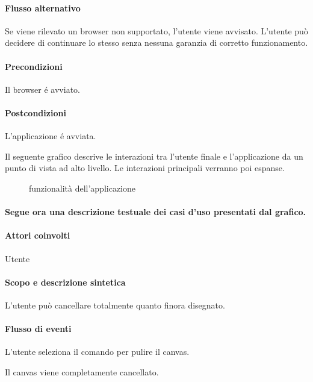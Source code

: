\paragraph{Flusso alternativo}
Se viene rilevato un browser non supportato, l'utente viene avvisato. L'utente pu\`o decidere di continuare lo stesso senza nessuna garanzia di corretto funzionamento.
\paragraph{Precondizioni} Il browser \'e avviato.
\paragraph{Postcondizioni} L'applicazione \'e avviata.

Il seguente grafico descrive le interazioni tra l'utente finale e l'applicazione da un punto di vista ad alto livello. Le interazioni principali verranno poi espanse.
\begin{figure}[!ht]
\centering
\vspace{20pt} 
\caption{funzionalit\`a dell'applicazione}
\end{figure}

\paragraph{Segue ora una descrizione testuale dei casi d'uso presentati dal grafico.}

\paragraph{Attori coinvolti} Utente
\paragraph{Scopo e descrizione sintetica}
L'utente pu\`o cancellare totalmente quanto finora disegnato.
\paragraph{Flusso di eventi}
\begin{elenconumerato}[\textbf{}]{\subsubsecindent}
\item L'utente seleziona il comando per pulire il canvas. 
\item Il canvas viene completamente cancellato.
\end{elenconumerato}
